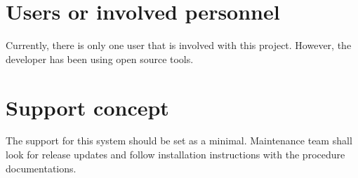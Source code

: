\section{Users or involved personnel}
\label{loc:Users or involved personnel}


Currently, there is only one user that is involved with this project. However, the developer has been using open source tools.


\section{Support concept}
\label{loc:Support concept}


The support for this system should be set as a minimal. Maintenance team shall look for release updates and follow installation instructions with the procedure documentations.

